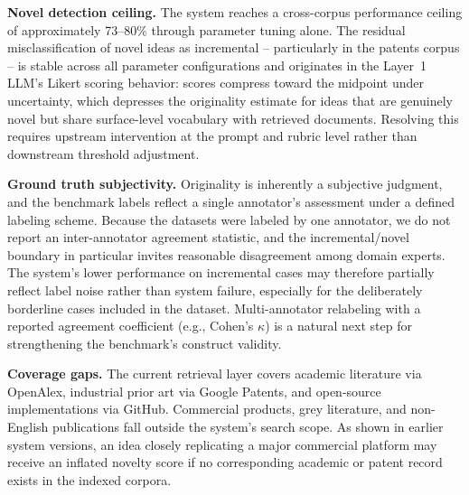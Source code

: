 \textbf{Novel detection ceiling.} The system reaches a cross-corpus performance ceiling of approximately 73--80\% through parameter tuning alone. The residual misclassification of novel ideas as incremental -- particularly in the patents corpus -- is stable across all parameter configurations and originates in the Layer~1 LLM's Likert scoring behavior: scores compress toward the midpoint under uncertainty, which depresses the originality estimate for ideas that are genuinely novel but share surface-level vocabulary with retrieved documents. Resolving this requires upstream intervention at the prompt and rubric level rather than downstream threshold adjustment.

\textbf{Ground truth subjectivity.} Originality is inherently a subjective judgment, and the benchmark labels reflect a single annotator's assessment under a defined labeling scheme. Because the datasets were labeled by one annotator, we do not report an inter-annotator agreement statistic, and the incremental/novel boundary in particular invites reasonable disagreement among domain experts. The system's lower performance on incremental cases may therefore partially reflect label noise rather than system failure, especially for the deliberately borderline cases included in the dataset. Multi-annotator relabeling with a reported agreement coefficient (e.g., Cohen's $\kappa$) is a natural next step for strengthening the benchmark's construct validity.

\textbf{Coverage gaps.} The current retrieval layer covers academic literature via OpenAlex, industrial prior art via Google Patents, and open-source implementations via GitHub. Commercial products, grey literature, and non-English publications fall outside the system's search scope. As shown in earlier system versions, an idea closely replicating a major commercial platform may receive an inflated novelty score if no corresponding academic or patent record exists in the indexed corpora.
